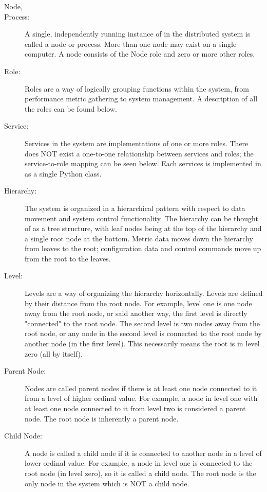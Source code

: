\begin{description}
\item[\dcamp Node,]
\item[\dcamp Process:]
A single, independently running instance of \dcamp in the distributed system is called a \dcamp node or process.
More than one node may exist on a single computer.
A node consists of the Node role and zero or more other \dcamp roles. 

\item[\dcamp Role:]
Roles are a way of logically grouping functions within the \newline \dcamp system, from performance metric gathering to \dcamp system management.
A description of all the \dcamp roles can be found below. 

\item[\dcamp Service:]
Services in the \dcamp system are implementations of one or more \dcamp roles.
There does NOT exist a one-to-one relationship between services and roles; the \dcamp service-to-role mapping can be seen below.
Each services is implemented in \dcamp as a single Python class. 

\item[\dcamp Hierarchy:]
The \dcamp system is organized in a hierarchical pattern with respect to data movement and system control functionality.
The hierarchy can be thought of as a tree structure, with leaf nodes being at the top of the hierarchy and a single root node at the bottom.
Metric data moves down the hierarchy from leaves to the root; configuration data and control commands move up from the root to the leaves. 

\item[\dcamp Level:]
Levels are a way of organizing the \dcamp hierarchy horizontally.
Levels are defined by their distance from the root node.
For example, level one is one node away from the root node, or said another way, the first level is directly "connected" to the root node.
The second level is two nodes away from the root node, or any node in the second level is connected to the root node by another node (in the first level).
This necessarily means the root is in level zero (all by itself). 

\item[Parent Node:]
Nodes are called parent nodes if there is at least one node connected to it from a level of higher ordinal value.
For example, a node in level one with at least one node connected to it from level two is considered a parent node.
The root node is inherently a parent node. 

\item[Child Node:]
A node is called a child node if it is connected to another node in a level of lower ordinal value.
For example, a node in level one is connected to the root node (in level zero), so it is called a child node.
The root node is the only node in the \dcamp system which is NOT a child node. 


\end{description}
